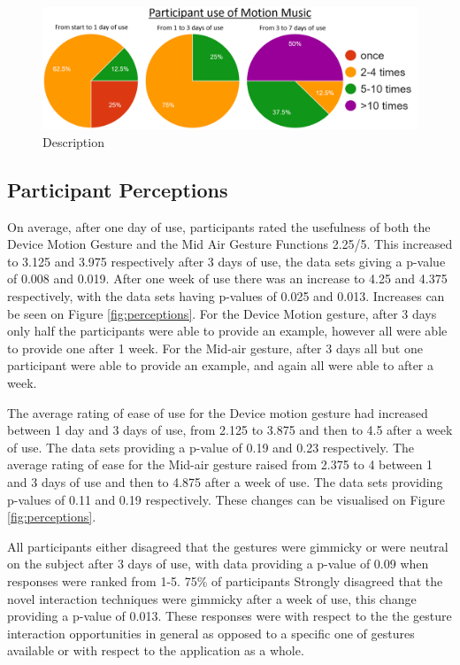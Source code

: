 \documentclass{l4proj}
\begin{document}
\begin{figure}[!htb]
    \centering
    \includegraphics[width=\textwidth]{images/Use of MM.PNG}
        \caption{Description}
        \label{fig:usage}
\end{figure}

\subsection{Participant Perceptions}

On average, after one day of use, participants rated the usefulness of both the Device Motion Gesture and the Mid Air Gesture Functions 2.25/5. This increased to 3.125 and 3.975 respectively after 3 days of use, the data sets giving a p-value of 0.008 and 0.019. After one week of use there was an increase to 4.25 and 4.375 respectively, with the data sets having p-values of 0.025 and 0.013. Increases can be seen on Figure \ref{fig:perceptions}. For the Device Motion gesture, after 3 days only half the participants were able to provide an example, however all were able to provide one after 1 week. For the Mid-air gesture, after 3 days all but one participant were able to provide an example, and again all were able to after a week.

The average rating of ease of use for the Device motion gesture had increased between 1 day and 3 days of use, from 2.125 to 3.875 and then to 4.5 after a week of use. The data sets providing a p-value of 0.19 and 0.23 respectively. The average rating of ease for the Mid-air gesture raised from 2.375 to 4 between 1 and 3 days of use and then to 4.875 after a week of use. The data sets providing p-values of 0.11 and 0.19 respectively. These changes can be visualised on Figure \ref{fig:perceptions}.

All participants either disagreed that the gestures were gimmicky or were neutral on the subject after 3 days of use, with data providing a p-value of 0.09 when responses were ranked from 1-5. 75\% of participants Strongly disagreed that the novel interaction techniques were gimmicky after a week of use, this change providing a p-value of 0.013. These responses were with respect to the the gesture interaction opportunities in general as opposed to a specific one of gestures available or with respect to the application as a whole.
\end{document}
